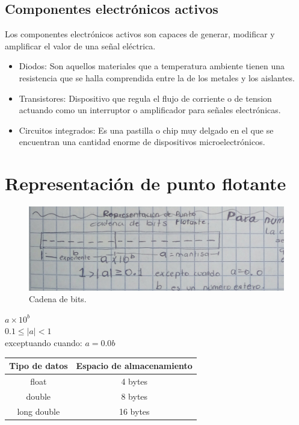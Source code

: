 \subsection{Componentes electr\'onicos activos}
Los componentes electr\'onicos activos son capaces de generar, modificar y amplificar el valor de una se\~nal el\'ectrica.

\begin{itemize}
\item Diodos: Son aquellos materiales que a temperatura ambiente tienen una resistencia que se halla comprendida entre la de los metales y los aislantes.
\item Transistores: Dispositivo que regula el flujo de corriente o de tension actuando como un interruptor o amplificador para se\~nales electr\'onicas.
\item Circuitos integrados: Es una pastilla o chip muy delgado en el que se encuentran una cantidad enorme de dispositivos microelectr\'onicos.
\end{itemize}

\section{Representaci\'on de punto flotante}


\begin{figure}[h]
\includegraphics[scale=.16]{cadena-de-bits}
\centering
\caption{Cadena de bits.}
\end{figure}

\begin{center}
$a \times 10^b$\\
$0.1 \leq |a| < 1$\\
exceptuando cuando: $a=0.0b$ \\ 
\bigskip
\begin{tabular}{| c | c |}
\hline
Tipo de datos & Espacio de almacenamiento\\
\hline 
float& 4 bytes\\
double & 8 bytes\\
long double & 16 bytes\\
\hline
\end{tabular}
\end{center}

